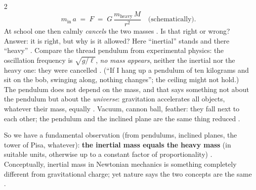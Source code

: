 \begin{paracol}{2}
\begin{equation}
  m_{\mathrm{in}}\,a \;=\; F \;=\; G\,\frac{m_{\mathrm{heavy}}\,M}{r^2}\quad\text{(schematically)}.
\end{equation}
At school one then calmly \emph{cancels} the two masses . Is that right or wrong?
Answer: it is right, but why is it allowed? Here ``inertial'' stands and there ``heavy'' .
Compare the thread pendulum from experimental physics: the oscillation frequency is $\sqrt{g/\ell}$, \emph{no mass
appears}, neither the inertial nor the heavy one: they were cancelled .
(``If I hang up a pendulum of ten kilograms and sit on the bob, swinging along, nothing changes''; the ceiling might not
hold.) The pendulum does not depend on the mass, and that says something not about the pendulum but about the
\emph{universe}: gravitation accelerates all objects, whatever their mass, equally . Vacuum,
cannon ball, feather: they fall next to each other; the pendulum and the inclined plane are the same thing
reduced .

So we have a fundamental observation (from pendulums, inclined planes, the tower of Pisa, whatever): \textbf{the inertial
mass equals the heavy mass} (in suitable units, otherwise up to a constant factor of proportionality)
. Conceptually, inertial mass in Newtonian mechanics is something completely different
from gravitational charge; yet nature says the two concepts are the same .


\end{paracol}
